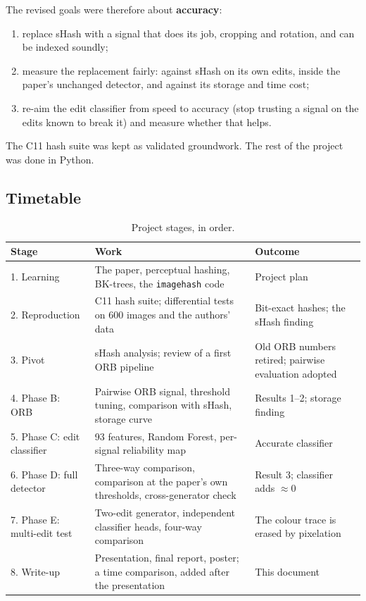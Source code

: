 The revised goals were therefore about \textbf{accuracy}:
\begin{enumerate}
  \item replace sHash with a signal that does its job, cropping and rotation, and can be indexed
        soundly;
  \item measure the replacement fairly: against sHash on its own edits, inside the paper's
        unchanged detector, and against its storage and time cost;
  \item re-aim the edit classifier from speed to accuracy (stop trusting a signal on the edits
        known to break it) and measure whether that helps.
\end{enumerate}
The C11 hash suite was kept as validated groundwork. The rest of the project was done in
Python.

\subsection{Timetable}

\begin{table}[ht]
\centering\small
\begin{tabularx}{\linewidth}{@{}l X X@{}}
\toprule
Stage & Work & Outcome \\
\midrule
1. Learning & The paper, perceptual hashing, BK-trees, the \texttt{imagehash} code & Project plan \\
2. Reproduction & C11 hash suite; differential tests on 600 images and the authors' data &
  Bit-exact hashes; the sHash finding \\
3. Pivot & sHash analysis; review of a first ORB pipeline & Old ORB numbers retired; pairwise
  evaluation adopted \\
4. Phase B: ORB & Pairwise ORB signal, threshold tuning, comparison with sHash, storage curve &
  Results 1--2; storage finding \\
5. Phase C: edit classifier & 93 features, Random Forest, per-signal reliability map &
  Accurate classifier \\
6. Phase D: full detector & Three-way comparison, comparison at the paper's own thresholds,
  cross-generator check & Result 3; classifier adds $\approx 0$ \\
7. Phase E: multi-edit test & Two-edit generator, independent classifier heads, four-way
  comparison & The colour trace is erased by pixelation \\
8. Write-up & Presentation, final report, poster; a time comparison, added after the
  presentation & This document \\
\bottomrule
\end{tabularx}
\caption{Project stages, in order.}
\label{tab:timetable}
\end{table}

